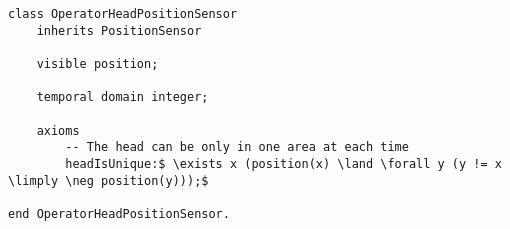 \begin{lstlisting}[fontadjust, mathescape, frame=single] 
class OperatorHeadPositionSensor
    inherits PositionSensor
    
    visible position;

    temporal domain integer;

    axioms
        -- The head can be only in one area at each time
        headIsUnique:$ \exists x (position(x) \land \forall y (y != x \limply \neg position(y)));$

end OperatorHeadPositionSensor.\end{lstlisting}